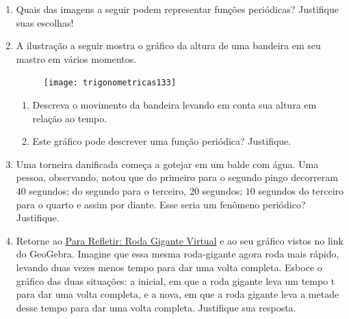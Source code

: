\begin{enumerate}
\item Quais das imagens a seguir podem representar funções periódicas? Justifique suas escolhas!
\begin{enumerate}
\end{enumerate}


\item A ilustração a seguir mostra o gráfico da altura de uma bandeira em seu mastro em vários momentos.
\begin{figure}[H]
\centering

\texttt{[image: trigonometricas133]}
\end{figure}
\begin{enumerate}
\item Descreva o movimento da bandeira levando em conta sua altura em relação ao tempo.
\item Este gráfico pode descrever uma função periódica? Justifique.
\end{enumerate}


\item Uma torneira danificada começa a gotejar em um balde com água. Uma pessoa, observando, notou que do primeiro para o segundo pingo decorreram $40$ segundos; do segundo para o terceiro, $20$ segundos; $10$ segundos do terceiro para o quarto e assim por diante. Esse seria um fenômeno periódico? Justifique.


\item Retorne ao \hyperref[trig-reflection1]{Para Refletir: Roda Gigante Virtual} e ao seu gráfico vistos no link do GeoGebra. Imagine que essa mesma roda-gigante agora roda mais rápido, levando duas vezes menos tempo para dar uma volta completa. Esboce o gráfico das duas situações: a inicial, em que a roda gigante leva um tempo t para dar uma volta completa, e a nova, em que a roda gigante leva a metade desse tempo para dar uma volta completa. Justifique sua resposta.


\end{enumerate}
